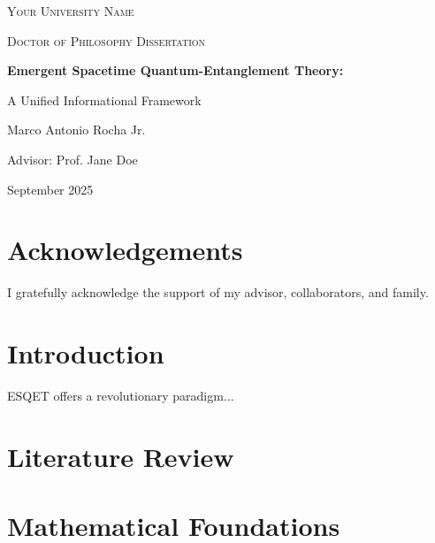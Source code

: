 \documentclass[12pt,a4paper]{report}
\begin{document}
\begin{titlepage}
  \centering
  {\scshape\LARGE Your University Name \par}
  \vspace{1cm}
  {\scshape\Large Doctor of Philosophy Dissertation\par}
  \vspace{2cm}
  {\huge\bfseries Emergent Spacetime Quantum-Entanglement Theory: \par A Unified Informational Framework\par}
  \vspace{2cm}
  {\Large Marco Antonio Rocha Jr.\par}
  \vfill
  Advisor: Prof. Jane Doe\par
  \vspace{1cm}
  {\large September 2025\par}
\end{titlepage}

\begin{abstract}
This dissertation presents Emergent Spacetime Quantum-Entanglement Theory (ESQET), a novel framework integrating fractal coherence and quantum informational physics to unify fundamental physics with biological aging and consciousness. We detail theoretical foundations, computational models, and suggest experimental validations.
\end{abstract}

\chapter*{Acknowledgements}
I gratefully acknowledge the support of my advisor, collaborators, and family.

\tableofcontents
\listoffigures
\listoftables

\chapter{Introduction}
\label{ch:intro}
ESQET offers a revolutionary paradigm...

\chapter{Literature Review}
\label{ch:litreview}

\chapter{Mathematical Foundations}
\label{ch:mathfound}
\end{document}
